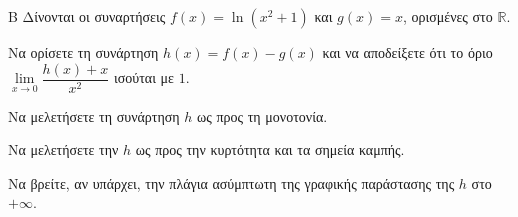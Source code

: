 \begin{thema}{Β}
Δίνονται οι συναρτήσεις $f(x) = \ln(x^2+1)$ και $g(x) = x$, ορισμένες στο $\mathbb{R}$.
\begin{erwthma}
\item Να ορίσετε τη συνάρτηση $h(x) = f(x) - g(x)$ και να αποδείξετε ότι το όριο $\lim\limits_{x \to 0} \dfrac{h(x)+x}{x^2}$ ισούται με $1$.
\item Να μελετήσετε τη συνάρτηση $h$ ως προς τη μονοτονία.
\item Να μελετήσετε την $h$ ως προς την κυρτότητα και τα σημεία καμπής.
\item Να βρείτε, αν υπάρχει, την πλάγια ασύμπτωτη της γραφικής παράστασης της $h$ στο $+\infty$.
\end{erwthma}
\end{thema}
